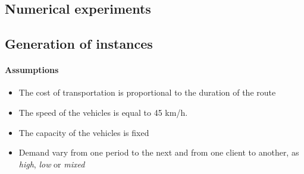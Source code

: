 \documentclass[a4paper,10pt]{article}
\begin{document}
\begin{linenumbers}



\section{Numerical experiments}
\label{sec:expe}
\subsection{Generation of instances}

\paragraph{Assumptions}
\begin{itemize}
    \item The cost of transportation is proportional to the duration of the route
    \item The speed of the vehicles is equal to 45 km/h.
    \item The capacity of the vehicles is fixed
    \item Demand vary from one period to the next and from one client to another, as {\em high}, {\em low} or {\em mixed}
    \end{itemize}



\end{linenumbers}
\end{document}
